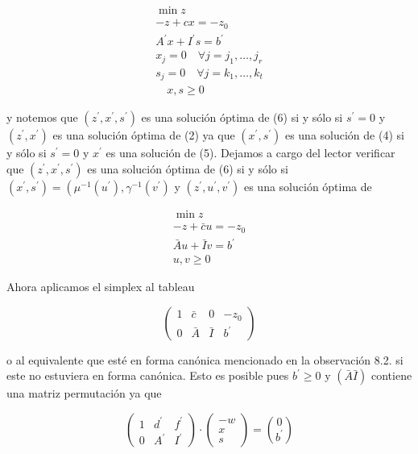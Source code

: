 \documentclass[10pt]{article}
\begin{document}
\begin{gather*}
\min z \\
-z+c x=-z_{0} \\
A^{\prime} x+I^{\prime} s=b^{\prime}  \tag{6}\\
x_{j}=0 \quad \forall j=j_{1}, \ldots, j_{r} \\
s_{j}=0 \quad \forall j=k_{1}, \ldots, k_{t} \\
\quad x, s \geq 0
\end{gather*}


y notemos que $\left(z^{\prime}, x^{\prime}, s^{\prime}\right)$ es una solución óptima de (6) si y sólo si $s^{\prime}=0$ y $\left(z^{\prime}, x^{\prime}\right)$ es una solución óptima de (2) ya que $\left(x^{\prime}, s^{\prime}\right)$ es una solución de (4) si y sólo si $s^{\prime}=0$ y $x^{\prime}$ es una solución de (5). Dejamos a cargo del lector verificar que $\left(z^{\prime}, x^{\prime}, s^{\prime}\right)$ es una solución óptima de (6) si y sólo si $\left(x^{\prime}, s^{\prime}\right)=\left(\mu^{-1}\left(u^{\prime}\right), \gamma^{-1}\left(v^{\prime}\right)\right.$ y $\left(z^{\prime}, u^{\prime}, v^{\prime}\right)$ es una solución óptima de


\begin{gather*}
\min z \\
-z+\bar{c} u=-z_{0}  \tag{7}\\
\bar{A} u+\bar{I} v=b^{\prime} \\
u, v \geq 0
\end{gather*}


Ahora aplicamos el simplex al tableau

$$
\left(\begin{array}{ccc|c}
1 & \bar{c} & 0 & -z_{0} \\
0 & \bar{A} & \bar{I} & b^{\prime}
\end{array}\right)
$$

o al equivalente que esté en forma canónica mencionado en la observación 8.2. si este no estuviera en forma canónica. Esto es posible pues $b^{\prime} \geq 0$ y $(\bar{A} \bar{I})$ contiene una matriz permutación ya que

$$
\left(\begin{array}{ccc}
1 & d^{\prime} & f^{\prime} \\
0 & A^{\prime} & I^{\prime}
\end{array}\right) \cdot\left(\begin{array}{c}
-w \\
x \\
s
\end{array}\right)=\binom{0}{b^{\prime}}
$$
\end{document}
